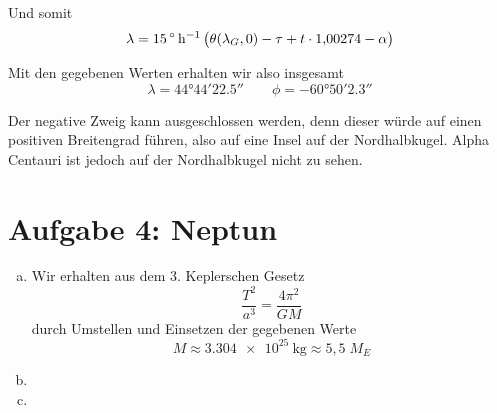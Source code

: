 \documentclass[a4paper,german,12pt,smallheadings]{scrartcl}
\begin{document}
Und somit
\begin{equation}
  \lambda = \SI{15}{\degree\per\hour} \del{\theta(\lambda_G, 0) - \tau + t \cdot 1{,}00274 - \alpha}
\end{equation}

Mit den gegebenen Werten erhalten wir also insgesamt
\begin{equation}
  \lambda = \ang{44;44;22.5} \qquad \phi = \ang{-60;50;2.3}
\end{equation}

Der negative Zweig kann ausgeschlossen werden, denn dieser würde auf einen
positiven Breitengrad führen, also auf eine Insel auf der Nordhalbkugel. Alpha
Centauri ist jedoch auf der Nordhalbkugel nicht zu sehen.

\section*{Aufgabe 4: Neptun}
\begin{enumerate}[a)]
  \item
    Wir erhalten aus dem 3. Keplerschen Gesetz
    \begin{equation}
      \frac{T^2}{a^3} = \frac{4 \pi^2}{G M}
    \end{equation}
    durch Umstellen und Einsetzen der gegebenen Werte
    \begin{equation}
      M \approx \SI{3.304e25}{\kilogram} \approx 5{,}5 \; M_E
    \end{equation}
  \item
  \item
\end{enumerate}
\end{document}
